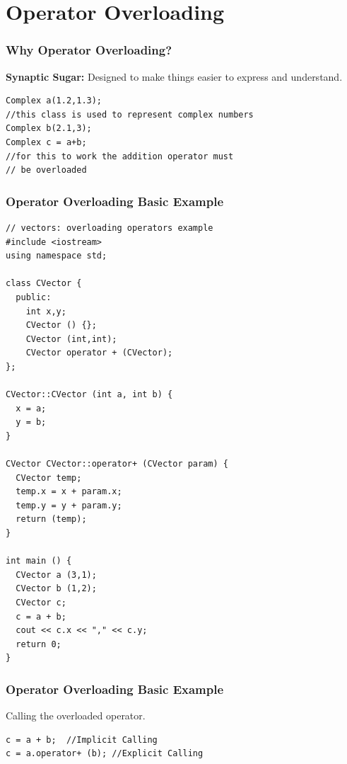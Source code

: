 \documentclass{beamer}
\newtheorem{Key points}{Key points}
\newcommand\Fontvi{\fontsize{5}{6.2}\selectfont}
\begin{document}
\section{Operator Overloading}

\begin{frame}[fragile]
\frametitle{Why Operator Overloading?}
\textbf{Synaptic Sugar: } Designed to make things easier to express and understand.
\begin{lstlisting}
Complex a(1.2,1.3);   
//this class is used to represent complex numbers  
Complex b(2.1,3);       
Complex c = a+b;        
//for this to work the addition operator must
// be overloaded
\end{lstlisting}
\end{frame}

\begin{frame}[fragile]
\frametitle{Operator Overloading Basic Example}
\Fontvi
\begin{lstlisting}
// vectors: overloading operators example
#include <iostream>
using namespace std;

class CVector {
  public:
    int x,y;
    CVector () {};
    CVector (int,int);
    CVector operator + (CVector);
};

CVector::CVector (int a, int b) {
  x = a;
  y = b;
}

CVector CVector::operator+ (CVector param) {
  CVector temp;
  temp.x = x + param.x;
  temp.y = y + param.y;
  return (temp);
}

int main () {
  CVector a (3,1);
  CVector b (1,2);
  CVector c;
  c = a + b;
  cout << c.x << "," << c.y;
  return 0;
}
\end{lstlisting}
\end{frame}
\begin{frame}[fragile]
\frametitle{Operator Overloading Basic Example}
Calling the overloaded operator.
\begin{lstlisting}
c = a + b;  //Implicit Calling
c = a.operator+ (b); //Explicit Calling
\end{lstlisting}
\end{frame}
\end{document}
